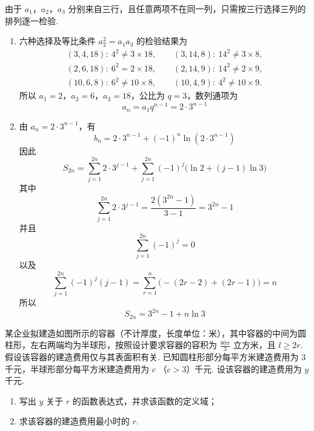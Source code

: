 \begin{solution}
由于 \(a_1\)，\(a_2\)，\(a_3\) 分别来自三行，且任意两项不在同一列，只需按三行选择三列的排列逐一检验.
\begin{enumerate}
\item 六种选择及等比条件 \(a_2^2=a_1a_3\) 的检验结果为
\[
\begin{gathered}
(3,4,18):\ 4^2\neq3\times18,\qquad (3,14,8):\ 14^2\neq3\times8,\\
(2,6,18):\ 6^2=2\times18,\qquad (2,14,9):\ 14^2\neq2\times9,\\
(10,6,8):\ 6^2\neq10\times8,\qquad (10,4,9):\ 4^2\neq10\times9.
\end{gathered}
\]
所以 \(a_1=2\)，\(a_2=6\)，\(a_3=18\)，公比为 \(q=3\)，数列通项为
\[
a_n=a_1q^{n-1}=2\cdot3^{n-1}
\]

\item 由 \(a_n=2\cdot3^{n-1}\)，有
\[
b_n=2\cdot3^{n-1}+(-1)^n\ln\left(2\cdot3^{n-1}\right)
\]
因此
\[
S_{2n}=\sum_{j=1}^{2n}2\cdot3^{j-1}+\sum_{j=1}^{2n}(-1)^j\bigl(\ln2+(j-1)\ln3\bigr)
\]
其中
\[
\sum_{j=1}^{2n}2\cdot3^{j-1}=\frac{2(3^{2n}-1)}{3-1}=3^{2n}-1
\]
并且
\[
\sum_{j=1}^{2n}(-1)^j=0
\]
以及
\[
\sum_{j=1}^{2n}(-1)^j(j-1)=\sum_{r=1}^{n}\bigl(-(2r-2)+(2r-1)\bigr)=n
\]
所以
\[
S_{2n}=3^{2n}-1+n\ln3
\]
\end{enumerate}
\end{solution}

\begin{problem}
某企业拟建造如图所示的容器（不计厚度，长度单位：米），其中容器的中间为圆柱形，左右两端均为半球形，按照设计要求容器的容积为 \(\frac{80\pi}{3}\) 立方米，且 \(l \geqslant 2r\). 假设该容器的建造费用仅与其表面积有关. 已知圆柱形部分每平方米建造费用为 3 千元，半球形部分每平方米建造费用为 \(c \) （\(c > 3\)）千元. 设该容器的建造费用为 \(y\) 千元.
\begin{enumerate}
\item 写出 \(y\) 关于 \(r\) 的函数表达式，并求该函数的定义域；
\item 求该容器的建造费用最小时的 \(r\).
\end{enumerate}

\end{problem}

